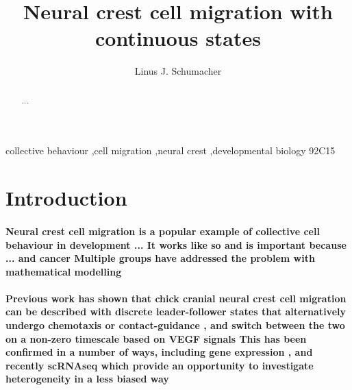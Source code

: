 \documentclass[review]{elsarticle}
\begin{document}
\begin{frontmatter}

\title{Neural crest cell migration with continuous states}

\author{Linus J. Schumacher}
\address{MCR Centre for Regenerative Medicine, University of Edinburgh}


\begin{abstract}
...
\end{abstract}

\begin{keyword}
collective behaviour \sep cell migration \sep neural crest \sep developmental biology
\MSC[2010] 92C15
\end{keyword}

\end{frontmatter}

\linenumbers

\section{Introduction}
\paragraph{Neural crest cell migration is a popular example of collective cell behaviour in development ... It works like so and is important because ...  and cancer \cite{Kulesa2006,Bailey2012,McLennan2017} Multiple groups have addressed the problem with mathematical modelling \cite{Simpson2007,Landman2011,Carmona-Fontaine2011,Wynn2012,Wynn2013,McLennan2012,McLennan2015,Mort2016,Zhang2018,Merchant2018}}

\paragraph{Previous work has shown that chick cranial neural crest cell migration can be described with discrete leader-follower states that alternatively undergo chemotaxis or contact-guidance \cite{McLennan2012,McLennan2015}, and switch between the two on a non-zero timescale based on VEGF signals \cite{McLennan2015b} This has been confirmed in a number of ways, including gene expression \cite{McLennan2015}, and recently scRNAseq \cite{Morrison2017} which provide an opportunity to investigate heterogeneity in a less biased way}
\end{document}
